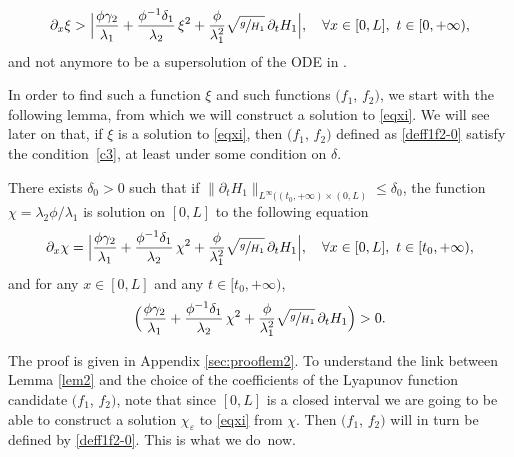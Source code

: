 \begin{equation}
\label{eqxi}
\partial_{x}\xi >\Bigl|\frac{\phi\gamma_{2}}{\lambda_{1}}+\frac{\phi^{-1}\delta_{1}}{\lambda_{2}}\,\xi^{2}+{\frac{\phi}{\lambda_{1}^{2}}}\sqrt{\sfrac{g}{H_{1}}}\,\partial_{t} H_{1}\Bigr|,\quad \forall x\in[0,L],\ t\in[0,+\infty),
\end{equation}
and not anymore to be a supersolution of the ODE in \cite{BastinCoron22}.

In order to find such {a function $\xi$ and such functions $(f_{1}$, $f_{2})$, we start with} the following lemma, {from which we will construct a solution to \eqref{eqxi}. We will see later on that, if $\xi$ is a solution to \eqref{eqxi}, then $(f_{1}$, $f_{2})$ defined as \eqref{deff1f2-0} satisfy the condition~\eqref{c3}, at least under some condition on $\delta$.}
\begin{lem}
There exists $\delta_{0}>0$ such that if $\lVert\partial_{t}H_{1}\rVert_{L^{\infty}(({t_{0}},+\infty)\times(0,L)}\leq \delta_{0}$,
the function $\chi={\lambda_{2}\phi}/\lambda_{1}$ is solution on $[0,L]$ to the following equation
\begin{equation}
\partial_{x}\chi
=\Bigl|\frac{\phi\gamma_{2}}{\lambda_{1}}+\frac{\phi^{-1}\delta_{1}}{\lambda_{2}}\,\chi^{2}+{\frac{\phi}{\lambda_{1}^{2}}}\sqrt{\sfrac{g}{H_{1}}}\,\partial_{t} H_{1}\Bigr|, \quad\forall x\in[0,L],\ t\in[{t_{0}},+\infty),
\label{eqg}
\end{equation}
and for any $x\in[0,L]$ and any $t\in[{t_{0}},+\infty)$,
\begin{equation}
\Bigl(\frac{\phi\gamma_{2}}{\lambda_{1}}+\frac{\phi^{-1}\delta_{1}}{\lambda_{2}}\,\chi^{2}+{\frac{\phi}{\lambda_{1}^{2}}}\sqrt{\sfrac{g}{H_{1}}}\,\partial_{t} H_{1}\Bigr)>0.
\label{positivity}
\end{equation}
\label{lem2}
\end{lem}
The proof is given in Appendix {\ref{sec:prooflem2}}.
To understand the link between Lemma \ref{lem2} {and the choice of the coefficients of the Lyapunov function candidate $(f_{1}$, $f_{2})$, note that since $[0,L]$ is a closed interval we are going to be able to construct a solution $\chi_{\varepsilon}$ to \eqref{eqxi} from $\chi$. Then $(f_{1}$, $f_{2})$ will in turn be defined by \eqref{deff1f2-0}. This is what we do~now.}

